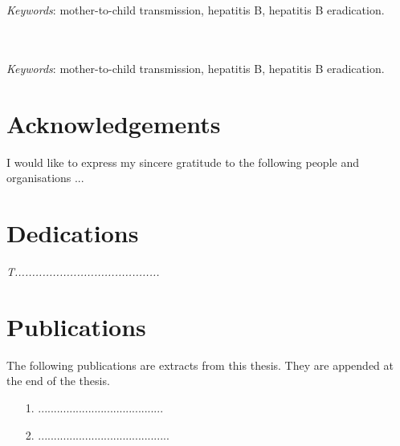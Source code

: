 \begin{abstract}[english]%
\textit{the abstract goes here}
\end{abstract}
\\\\
\textit{Keywords}:  mother-to-child transmission,  hepatitis B, hepatitis B eradication.



\begin{abstract}%
.........................................................................
\end{abstract}
\\\\
\textit{Keywords}: mother-to-child transmission,  hepatitis B, hepatitis B eradication.



\chapter*{Acknowledgements}%


I would like to express my sincere gratitude to the following people
and organisations ...


\chapter*{Dedications}%
 \vspace{6cm}
 \begin{center}\itshape
T..........................................
 \end{center}
\vfill
 \clearpage
\chapter{Publications}%

The following publications are extracts from this thesis. They are appended at the
end of the thesis.
\begin{itemize}
\item[1.] ........................................
\item[2.] ..........................................
\end{itemize}


\endinput
